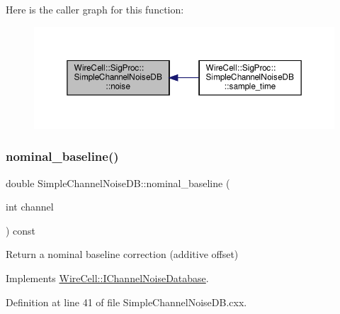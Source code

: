 Here is the caller graph for this function\+:
\nopagebreak
\begin{figure}[H]
\begin{center}
\leavevmode
\includegraphics[width=350pt]{class_wire_cell_1_1_sig_proc_1_1_simple_channel_noise_d_b_ab0b17e111bc6617ac4702610b262ed2f_icgraph}
\end{center}
\end{figure}
\mbox{\label{class_wire_cell_1_1_sig_proc_1_1_simple_channel_noise_d_b_ae5b0390412d61c8fab8514ddd8358fa1}} 
\subsubsection{\texorpdfstring{nominal\+\_\+baseline()}{nominal\_baseline()}}
{\footnotesize\ttfamily double Simple\+Channel\+Noise\+D\+B\+::nominal\+\_\+baseline (\begin{DoxyParamCaption}\item[{int}]{channel }\end{DoxyParamCaption}) const\hspace{0.3cm}{\ttfamily [virtual]}}



Return a nominal baseline correction (additive offset) 



Implements \hyperlink{class_wire_cell_1_1_i_channel_noise_database_a253f602c70bddb7986e63dc14b8d8e6e}{Wire\+Cell\+::\+I\+Channel\+Noise\+Database}.



Definition at line 41 of file Simple\+Channel\+Noise\+D\+B.\+cxx.

